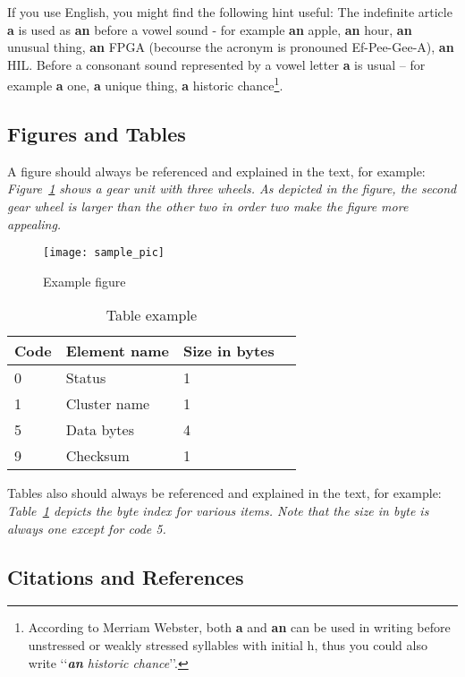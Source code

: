 \documentclass[10pt,a4paper,twoside,twocolumn]{article}
\def\lqq{\lq\lq}
\def\rqq{\rq\rq}
\def\zitat#1{\lqq \emph{#1}\rqq}
\begin{document}
If you use English, you might find the following hint useful: The
indefinite article \textbf{a} is used as \textbf{an} before a vowel
sound - for example \textbf{an} apple, \textbf{an} hour, \textbf{an}
unusual thing, \textbf{an} FPGA (becourse the acronym is pronouned
Ef-Pee-Gee-A), \textbf{an} HIL. Before a consonant sound represented
by a vowel letter \textbf{a} is usual -- for example \textbf{a} one,
\textbf{a} unique thing, \textbf{a} historic
chance\footnote{According to Merriam Webster, both \textbf{a} and
\textbf{an} can be used in writing before unstressed or weakly
stressed syllables with initial h, thus you could also write
\zitat{\textbf{an} historic chance}.}.

\subsection{Figures and Tables}

A figure should always be referenced and explained in the text, for
example: \emph{Figure~\ref{fig:example} shows a gear unit with three
wheels. As depicted in the figure, the second gear wheel is larger
than the other two in order two make the figure more appealing.}

\begin{figure}[h]
 \centerline{\texttt{[image: sample\_pic]}}
  \caption{Example figure}
  \label{fig:example}
\end{figure}

\begin{table}[hbt]
\begin{center}
\begin{tabular}{|p{2cm}|p{2.5cm}|p{2cm}c@{}|}
 \hline
 Code & Element name & Size in bytes &\\
 \hline
 0 & Status & 1 &\\
 1 & Cluster name & 1 &\\
 5 & Data bytes & 4&\\
 9 & Checksum & 1&\\
 \hline
\end{tabular}
\end{center}
\caption{Table example} \label{tab:sample}
\end{table}

Tables also should always be referenced and explained in the text,
for example: \emph{Table~\ref{tab:sample} depicts the byte index for
various items. Note that the size in byte is always one except for
code 5.}

\subsection{Citations and References}
\end{document}
